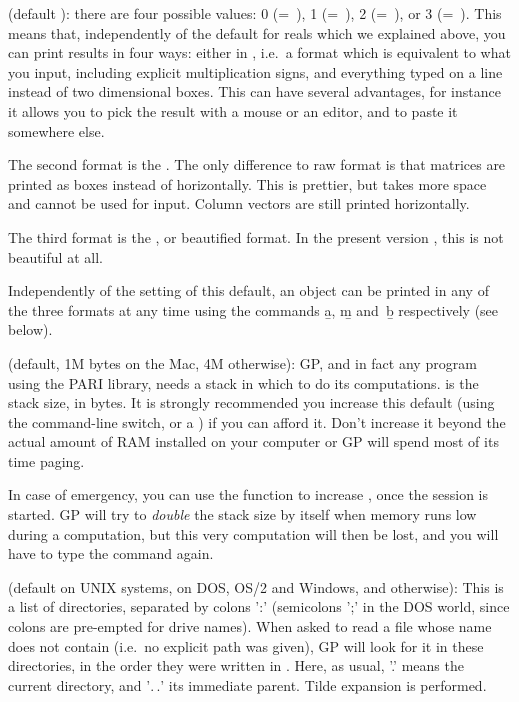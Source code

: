  (default ): there are four possible values: 0
(=~), 1 (=~), 2 (=~), or 3
(=~). This
means that, independently of the default  for reals which we
explained above, you can print results in four ways: either in , i.e.~a format which is equivalent to what you input, including
explicit multiplication signs, and everything typed on a line instead of
two dimensional boxes. This can have several advantages, for instance it
allows you to pick the result with a mouse or an editor, and to paste it
somewhere else.\label{se:output}

The second format is the . The only difference to
raw format is that matrices are printed as boxes instead of horizontally.
This is prettier, but takes more space and cannot be used for input. Column
vectors are still printed horizontally.

The third format is the , or beautified format. In
the present version \vers, this is not beautiful at all.


Independently of the setting of this default, an object can be printed
in any of the three formats at any time using the commands \b{a}, \b{m}
and~\b{b} respectively (see below).

\label{se:parisize} (default, 1M bytes on the Mac, 4M
otherwise): GP, and in fact any program using the PARI library, needs a stack
in which to do its computations.  is the stack size, in bytes.
It is strongly recommended you increase this default (using the 
command-line switch, or a ) if you can afford it. Don't increase it
beyond the actual amount of RAM installed on your computer or GP will spend
most of its time paging.

In case of emergency, you can use the  function to
increase , once the session is started. GP will try to
\emph{double} the stack size by itself when memory runs low during a
computation, but this very computation will then be lost, and you will have
to type the command again.

 (default  on UNIX systems,
 on DOS, OS/2 and Windows, and  otherwise):
This is a list of directories, separated by colons ':' (semicolons ';' in the
DOS world, since colons are pre-empted for drive names). When asked to read a
file whose name does not contain \kbd{/} (i.e.~no explicit path was given),
GP will look for it in these directories, in the order they were written in
. Here, as usual, '.' means the current directory, and '$.\,.$' its
immediate parent. Tilde expansion is performed.

